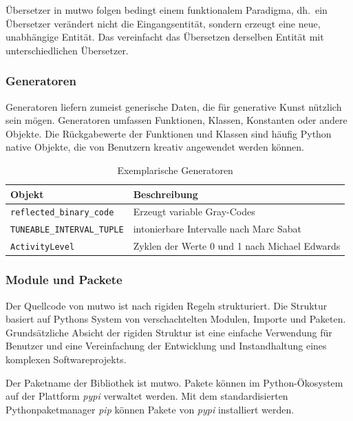 \documentclass[12pt,a4paper,ngerman]{article}
\begin{document}
Übersetzer in mutwo folgen bedingt einem funktionalem Paradigma, dh.\ ein Übersetzer verändert nicht die Eingangsentität, sondern erzeugt eine neue, unabhängige Entität.
Das vereinfacht das Übersetzen derselben Entität mit unterschiedlichen Übersetzer.

\subsubsection{Generatoren}

Generatoren liefern zumeist generische Daten, die für generative Kunst nützlich sein mögen.
Generatoren umfassen Funktionen, Klassen, Konstanten oder andere Objekte.
Die Rückgabewerte der Funktionen und Klassen sind häufig Python native Objekte, die von Benutzern kreativ angewendet werden können.

\begin{table}[h!]
    \begin{center}
        \begin{tabular}{l l} 
            \hline
            Objekt & Beschreibung \\ [0.5ex] 
            \hline\hline
            \texttt{reflected\_binary\_code} & Erzeugt variable Gray-Codes \\
            \texttt{TUNEABLE\_INTERVAL\_TUPLE} & intonierbare Intervalle nach Marc Sabat \\
            \texttt{ActivityLevel} & Zyklen der Werte 0 und 1 nach Michael Edwards \\ [1ex] 
            \hline
        \end{tabular}
    \end{center}

    \caption{Exemplarische Generatoren}
\end{table}

\subsubsection{Module und Packete}

Der Quellcode von mutwo ist nach rigiden Regeln strukturiert.
Die Struktur basiert auf Pythons System von verschachtelten Modulen, Importe und Paketen.
Grundsätzliche Absicht der rigiden Struktur ist eine einfache Verwendung für Benutzer und eine Vereinfachung der Entwicklung und Instandhaltung eines komplexen Softwareprojekts.

Der Paketname der Bibliothek ist mutwo.
Pakete können im Python-Ökosystem auf der Plattform \emph{pypi} verwaltet werden.
Mit dem standardisierten Pythonpaketmanager \emph{pip} können Pakete von \emph{pypi} installiert werden.
\end{document}
